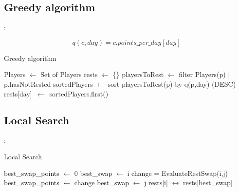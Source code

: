 \documentclass[9pt, aspectratio=169, xcolor=table]{beamer}
\begin{document}
\subsection{Greedy algorithm}
\begin{frame}{\secname: \subsecname}
\begin{tcolorbox}[colback=gray!30, colframe=Veronablue, arc=0pt, outer arc=0pt, title = \textbf{Greedy cost function}]
    \begin{equation*}
      q(c,day)= c.points\_per\_day[day]
    \end{equation*}
\end{tcolorbox}


\begin{algorithm}[H]
	\caption{Greedy algorithm} 
	\begin{algorithmic}[1]
	  \State Players $\leftarrow$ Set of Players
	  \State rests $\leftarrow$ \{\}
	    \State playersToRest $\leftarrow$ filter Players(p) $|$ p.hasNotRested
	    \State sortedPlayers $\leftarrow$ sort playersToRest(p) by q(p,day) (DESC) 
	    \State rests[day]\ $\leftarrow$\ sortedPlayers.first()
	  \EndFor
	\end{algorithmic} 
\end{algorithm}
\end{frame}

\subsection{Local Search}
\begin{frame}{\secname: \subsecname}
\begin{algorithm}[H]
	\caption{Local Search} 
	\begin{algorithmic}[1]
    \State best\_swap\_points $\leftarrow$ 0
    \State best\_swap $\leftarrow$ i
        \State change = EvaluateRestSwap(i,j)
          \State best\_swap\_points $\leftarrow$ change
          \State best\_swap $\leftarrow$ j
        \EndIf
      \EndFor
      \State rests[i] $\leftrightarrow$ rests[best\_swap]
		\EndFor
	\end{algorithmic} 
\end{algorithm}



\end{frame}
\end{document}
